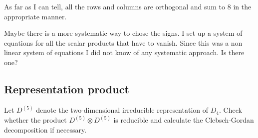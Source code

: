 \documentclass[11pt, english, fleqn, DIV=15, headinclude, BCOR=1cm]{scrartcl}
\begin{document}
As far as I can tell, all the rows and columns are orthogonal and sum to 8 in
the appropriate manner.

\begin{question}
    Maybe there is a more systematic way to chose the signs. I set up a system
    of equations for all the scalar products that have to vanish. Since this
    was a non linear system of equations I did not know of any systematic
    approach. Is there one?
\end{question}


\subsection{Representation product}

\begin{problem}
    Let $D^{(5)}$ denote the two-dimensional irreducible representation of
    $D_4$. Check whether the product $D^{(5)} \otimes D^{(5)}$ is reducible and
    calculate the Clebsch-Gordan decomposition if necessary.
\end{problem}
\end{document}
